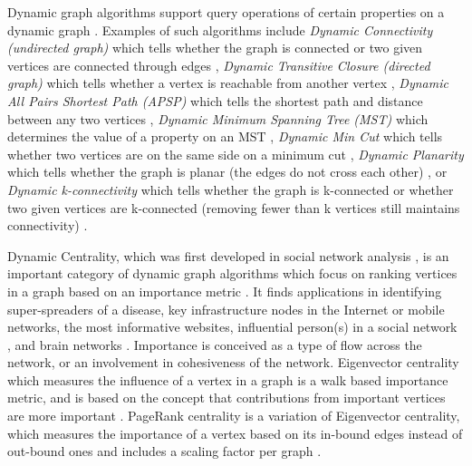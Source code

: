 Dynamic graph algorithms support query operations of certain properties on a dynamic graph \cite{graph-italiano99}. Examples of such algorithms include \emph{Dynamic Connectivity (undirected graph)} which tells whether the graph is connected or two given vertices are connected through edges \cite{conn-patrascu04}, \emph{Dynamic Transitive Closure (directed graph)} which tells whether a vertex is reachable from another vertex \cite{conn-demetrescu00}, \emph{Dynamic All Pairs Shortest Path (APSP)} which tells the shortest path and distance between any two vertices \cite{apsp-demetrescu04}, \emph{Dynamic Minimum Spanning Tree (MST)} which determines the value of a property on an MST \cite{mst-henzinger97}, \emph{Dynamic Min Cut} which tells whether two vertices are on the same side on a minimum cut \cite{cut-italiano11}, \emph{Dynamic Planarity} which tells whether the graph is planar (the edges do not cross each other) \cite{planar-galil99}, or \emph{Dynamic k-connectivity} which tells whether the graph is k-connected or whether two given vertices are k-connected (removing fewer than k vertices still maintains connectivity) \cite{conn-liang01} \cite{graph-italiano99}.

Dynamic Centrality, which was first developed in social network analysis \cite{graph-newman18}, is an important category of dynamic graph algorithms which focus on ranking vertices in a graph based on an importance metric \cite{centrality-bonacich87}. It finds applications in identifying super-spreaders of a disease, key infrastructure nodes in the Internet or mobile networks, the most informative websites, influential person(s) in a social network \cite{centrality-borgatti05}, and brain networks \cite{brain-vandenheuvel13} \cite{brain-saberi21}. Importance is conceived as a type of flow across the network, or an involvement in cohesiveness of the network. Eigenvector centrality which measures the influence of a vertex in a graph is a walk based importance metric, and is based on the concept that contributions from important vertices are more important \cite{graph-newman16}. PageRank centrality is a variation of Eigenvector centrality, which measures the importance of a vertex based on its in-bound edges instead of out-bound ones and includes a scaling factor per graph \cite{pr-network20q}.

